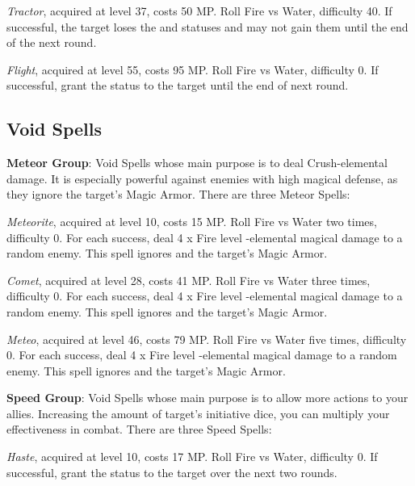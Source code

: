\begin{multicols}{2}
    \textit{Tractor}, acquired at level 37, costs 50 MP\@. Roll Fire vs Water, difficulty 40. If successful, the target loses the  and  statuses and may not gain them until the end of the next round.
    
    \textit{Flight}, acquired at level 55, costs 95 MP\@. Roll Fire vs Water, difficulty 0. If successful, grant the  status to the target until the end of next round.
    
    \subsection{Void Spells}\label{subsec:time-void}

    \textbf{Meteor Group}: Void Spells whose main purpose is to deal Crush-elemental damage. It is especially powerful against enemies with high magical defense, as they ignore the target’s Magic Armor. There are three Meteor Spells:
    
    \textit{Meteorite}, acquired at level 10, costs 15 MP\@. Roll Fire vs Water two times, difficulty 0. For each success, deal 4 x Fire level -elemental magical damage to a random enemy. This spell ignores  and the target’s Magic Armor.
    
    \textit{Comet}, acquired at level 28, costs 41 MP\@. Roll Fire vs Water three times, difficulty 0. For each success, deal 4 x Fire level -elemental magical damage to a random enemy. This spell ignores  and the target’s Magic Armor.
    
    \textit{Meteo}, acquired at level 46, costs 79 MP\@. Roll Fire vs Water five times, difficulty 0. For each success, deal 4 x Fire level -elemental magical damage to a random enemy. This spell ignores  and the target’s Magic Armor.
    
    \ffcrystal[type=level,height=8pt]

    \textbf{Speed Group}: Void Spells whose main purpose is to allow more actions to your allies. Increasing the amount of target’s initiative dice, you can multiply your effectiveness in combat. There are three Speed Spells:
    
    \textit{Haste}, acquired at level 10, costs 17 MP\@. Roll Fire vs Water, difficulty 0. If successful, grant the  status to the target over the next two rounds.
    

\end{multicols}
